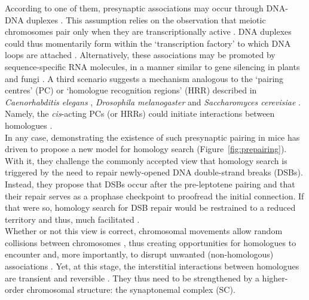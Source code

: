 According to one of them, presynaptic associations may occur through DNA-DNA duplexes \citep{danilowicz2009single}. 
This assumption relies on the observation that meiotic chromosomes pair only when they are transcriptionally active \citep{cook1997transcriptional}. 
DNA duplexes could thus momentarily form within the ‘transcription factory’ to which DNA loops are attached \citep{xu2008similar}.
Alternatively, these associations may be promoted by sequence-specific RNA molecules, in a manner similar to gene silencing in plants and fungi \citep[cited in \citealp{zickler2006early}]{bender2004dna}.
A third scenario suggests a mechanism analogous to the ‘pairing centres’ (PC) or ‘homologue recognition regions’ (HRR) described in \textit{Caenorhabditis elegans} \citep{villeneuve1994cis,macqueen2005chromosome}, \textit{Drosophila melanogaster} \citep{mckee1996license} and \textit{Saccharomyces cerevisiae} \citep{kemp2004role}.
Namely, the \textit{cis}-acting PCs (or HRRs) could initiate interactions between homologues \citep{gerton2005homologous}.\\


In any case, demonstrating the existence of such presynaptic pairing in mice has driven \citet{boateng2013homologous} to propose a new model for homology search (Figure~\ref{fig:prepairing}).
With it, they challenge the commonly accepted view that homology search is triggered by the need to repair newly-opened DNA double-strand breaks (DSBs).
Instead, they propose that DSBs occur after the pre-leptotene pairing and that their repair serves as a prophase checkpoint to proofread the initial connection.
If that were so, homology search for DSB repair would be restrained to a reduced territory and thus, much facilitated \citep{barzel2008finding,mirny2011fractal}.\\

Whether or not this view is correct, chromosomal movements allow random collisions between chromosomes \citep{fung1998homologous}, thus creating opportunities for homologues to encounter and, more importantly, to disrupt unwanted (non-homologous) associations \citep{koszul2009dynamic}.
Yet, at this stage, the interstitial interactions between homologues are transient and reversible \citep{boateng2013homologous}.
They thus need to be strengthened by a higher-order chromosomal structure: the synaptonemal complex (SC).



